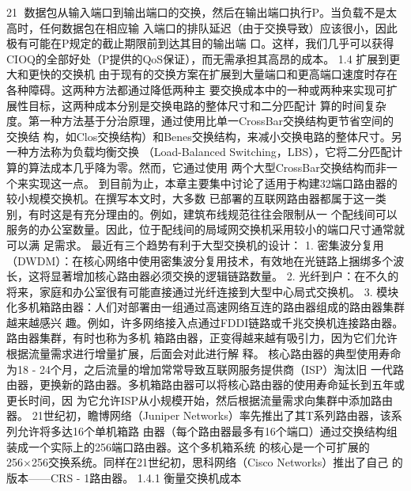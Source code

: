                                                                  21
数据包从输入端口到输出端口的交换，然后在输出端口执行P。当负载不是太高时，任何数据包在相应输
入端口的排队延迟（由于交换导致）应该很小，因此极有可能在P规定的截止期限前到达其目的输出端
口。这样，我们几乎可以获得CIOQ的全部好处（P提供的QoS保证），而无需承担其高昂的成本。
1.4 扩展到更大和更快的交换机
由于现有的交换方案在扩展到大量端口和更高端口速度时存在各种障碍。这两种方法都通过降低两种主
要交换成本中的一种或两种来实现可扩展性目标，这两种成本分别是交换电路的整体尺寸和二分匹配计
算的时间复杂度。第一种方法基于分治原理，通过使用比单一CrossBar交换结构更节省空间的交换结
构，如Clos交换结构）和Benes交换结构，来减小交换电路的整体尺寸。另一种方法称为负载均衡交换
（Load-Balanced Switching，LBS），它将二分匹配计算的算法成本几乎降为零。然而，它通过使用
两个大型CrossBar交换结构而非一个来实现这一点。
到目前为止，本章主要集中讨论了适用于构建32端口路由器的较小规模交换机。在撰写本文时，大多数
已部署的互联网路由器都属于这一类别，有时这是有充分理由的。例如，建筑布线规范往往会限制从一
个配线间可以服务的办公室数量。因此，位于配线间的局域网交换机采用较小的端口尺寸通常就可以满
足需求。
最近有三个趋势有利于大型交换机的设计：
 1. 密集波分复用（DWDM）：在核心网络中使用密集波分复用技术，有效地在光链路上捆绑多个波
    长，这将显著增加核心路由器必须交换的逻辑链路数量。
 2. 光纤到户：在不久的将来，家庭和办公室很有可能直接通过光纤连接到大型中心局式交换机。
 3. 模块化多机箱路由器：人们对部署由一组通过高速网络互连的路由器组成的路由器集群越来越感兴
    趣。例如，许多网络接入点通过FDDI链路或千兆交换机连接路由器。路由器集群，有时也称为多机
    箱路由器，正变得越来越有吸引力，因为它们允许根据流量需求进行增量扩展，后面会对此进行解
    释。
核心路由器的典型使用寿命为18 - 24个月，之后流量的增加常常导致互联网服务提供商（ISP）淘汰旧
一代路由器，更换新的路由器。多机箱路由器可以将核心路由器的使用寿命延长到五年或更长时间，因
为它允许ISP从小规模开始，然后根据流量需求向集群中添加路由器。
21世纪初，瞻博网络（Juniper Networks）率先推出了其T系列路由器，该系列允许将多达16个单机箱路
由器（每个路由器最多有16个端口）通过交换结构组装成一个实际上的256端口路由器。这个多机箱系统
的核心是一个可扩展的256×256交换系统。同样在21世纪初，思科网络（Cisco Networks）推出了自己
的版本——CRS - 1路由器。
1.4.1 衡量交换机成本


